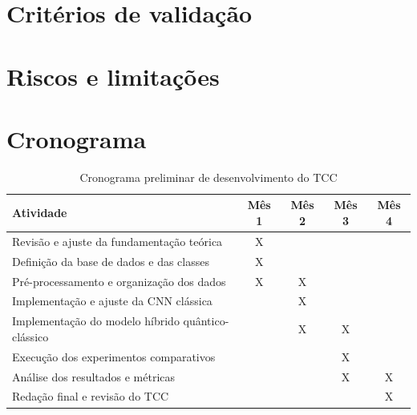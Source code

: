 \documentclass[
    12pt,
    openright,
    oneside,
    a4paper,
    english,
    brazil
]{abntex2}
\begin{document}

\section{Critérios de validação}


\section{Riscos e limitações}


\section{Cronograma}


\begin{table}[htb]
\centering
\caption{Cronograma preliminar de desenvolvimento do TCC}
\label{tab:cronograma}
\begin{tabular}{|p{7cm}|c|c|c|c|}
\hline
\textbf{Atividade} & \textbf{Mês 1} & \textbf{Mês 2} & \textbf{Mês 3} & \textbf{Mês 4} \\ \hline
Revisão e ajuste da fundamentação teórica & X &  &  &  \\ \hline
Definição da base de dados e das classes & X &  &  &  \\ \hline
Pré-processamento e organização dos dados & X & X &  &  \\ \hline
Implementação e ajuste da CNN clássica &  & X &  &  \\ \hline
Implementação do modelo híbrido quântico-clássico &  & X & X &  \\ \hline
Execução dos experimentos comparativos &  &  & X &  \\ \hline
Análise dos resultados e métricas &  &  & X & X \\ \hline
Redação final e revisão do TCC &  &  &  & X \\ \hline
\end{tabular}
\end{table}


\postextual


\end{document}

